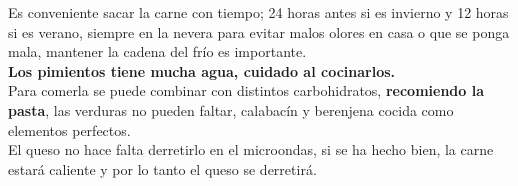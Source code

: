 \documentclass[a4paper,12pt]{article}
\begin{document}
\begin{notes}
Es conveniente sacar la carne con tiempo; 24 horas antes si es invierno y 12 horas si es verano, siempre en la nevera para evitar malos olores en casa o que se ponga mala, mantener la cadena del frío es importante.\\
\textbf{Los pimientos tiene mucha agua, cuidado al cocinarlos.}\\
Para comerla se puede combinar con distintos carbohidratos, \textbf{recomiendo la pasta}, las verduras no pueden faltar, calabacín y berenjena cocida como elementos perfectos.\\
El queso no hace falta derretirlo en el microondas, si se ha hecho bien, la carne estará caliente y por lo tanto el queso se derretirá.
\end{notes}
\end{document}
